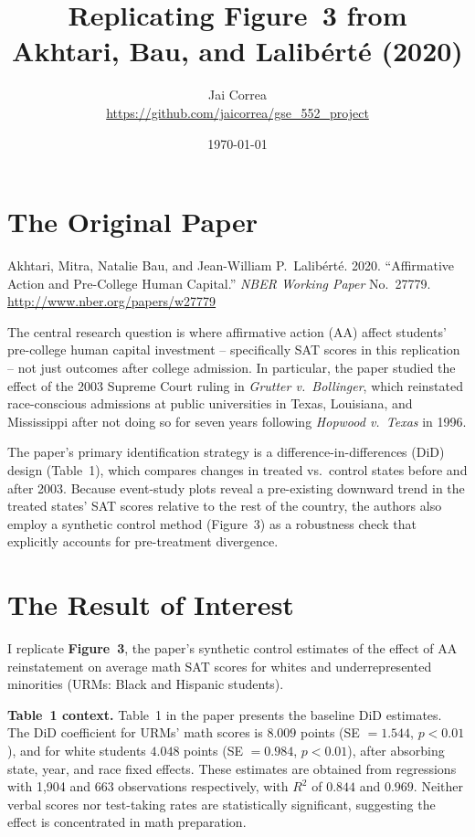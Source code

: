 \documentclass[12pt]{article}
\title{Replicating Figure~3 from\\
       Akhtari, Bau, and Lalibért{\'e} (2020)}
\author{Jai Correa\\
\small\url{https://github.com/jaicorrea/gse_552_project}}
\date{\today}
\begin{document}
\maketitle

\section{The Original Paper}

Akhtari, Mitra, Natalie Bau, and Jean-William P.\ Lalibért{\'e}. 2020.
``Affirmative Action and Pre-College Human Capital.''
\textit{NBER Working Paper} No.\ 27779.
\url{http://www.nber.org/papers/w27779}

\noindent The central research question is where affirmative action (AA) affect
students' pre-college human capital investment -- specifically SAT scores
in this replication -- not just outcomes after college admission.
In particular, the paper studied the effect of the 2003 Supreme Court
ruling in \textit{Grutter v.\ Bollinger}, which reinstated race-conscious
admissions at public universities in Texas, Louisiana, and Mississippi
after not doing so for seven years following \textit{Hopwood v.\ Texas}
in 1996.

\noindent The paper's primary identification strategy is a difference-in-differences
(DiD) design (Table~1), which compares changes in treated vs.\ control
states before and after 2003. Because event-study plots reveal a
pre-existing downward trend in the treated states' SAT scores relative to
the rest of the country, the authors also employ a synthetic control method
(Figure~3) as a robustness check that explicitly accounts for pre-treatment
divergence.

\section{The Result of Interest}

I replicate \textbf{Figure~3}, the paper's synthetic control estimates of
the effect of AA reinstatement on average math SAT scores for whites and
underrepresented minorities (URMs: Black and Hispanic students).

\medskip
\noindent\textbf{Table~1 context.}
Table~1 in the paper presents the baseline DiD estimates.
The DiD coefficient for URMs' math scores is $8.009$ points (SE $= 1.544$,
$p < 0.01$), and for white students $4.048$ points (SE $= 0.984$,
$p < 0.01$), after absorbing state, year, and race fixed effects.
These estimates are obtained from regressions with 1,904 and 663
observations respectively, with $R^{2}$ of $0.844$ and $0.969$.
Neither verbal scores nor test-taking rates are statistically significant,
suggesting the effect is concentrated in math preparation.
\end{document}
